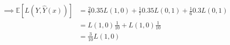 \documentclass[letter, 11pt, twoside]{report}
\begin{document}
\begin{equation*}
    \begin{split}
        \implies \mathbb{E}[L(Y, \widehat{Y}(x))] &=\frac{2}{7} 0.35 L(1,0)+\frac{1}{7} 0.35 L(0,1)+\frac{1}{6} 0.3 L(0,1) \\
        &=L(1,0) \frac{1}{10}+L(1,0) \frac{1}{10}\\
        &=\frac{3}{10} L(1,0)
    \end{split}
\end{equation*}


\end{document}
